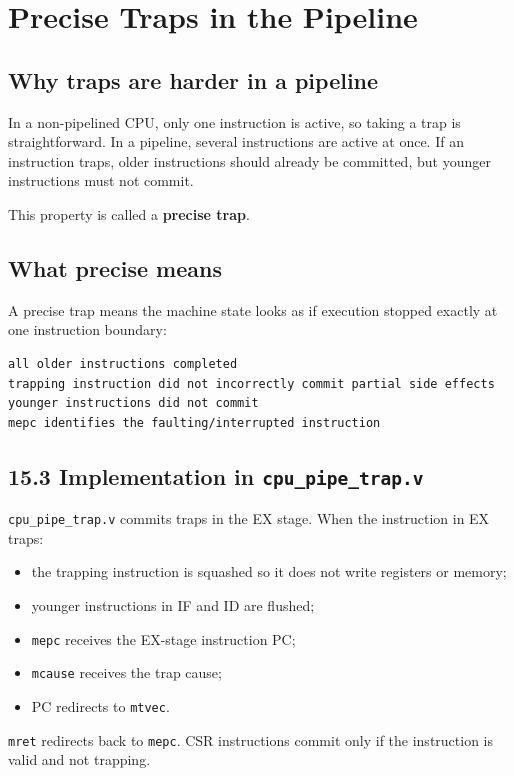 \section{Precise Traps in the Pipeline}

\subsection{Why traps are harder in a pipeline}

In a non-pipelined CPU, only one instruction is active, so taking a trap is straightforward. In a pipeline, several instructions are active at once. If an instruction traps, older instructions should already be committed, but younger instructions must not commit.

This property is called a \textbf{precise trap}.

\subsection{What precise means}

A precise trap means the machine state looks as if execution stopped exactly at one instruction boundary:

\begin{lstlisting}[language={}]
all older instructions completed
trapping instruction did not incorrectly commit partial side effects
younger instructions did not commit
mepc identifies the faulting/interrupted instruction
\end{lstlisting}

\subsection{15.3 Implementation in \texttt{cpu\_pipe\_trap.v}}

\texttt{cpu\_pipe\_trap.v} commits traps in the EX stage. When the instruction in EX traps:

\begin{itemize}
\item the trapping instruction is squashed so it does not write registers or memory;
\item younger instructions in IF and ID are flushed;
\item \texttt{mepc} receives the EX-stage instruction PC;
\item \texttt{mcause} receives the trap cause;
\item PC redirects to \texttt{mtvec}.
\end{itemize}
\texttt{mret} redirects back to \texttt{mepc}. CSR instructions commit only if the instruction is valid and not trapping.

